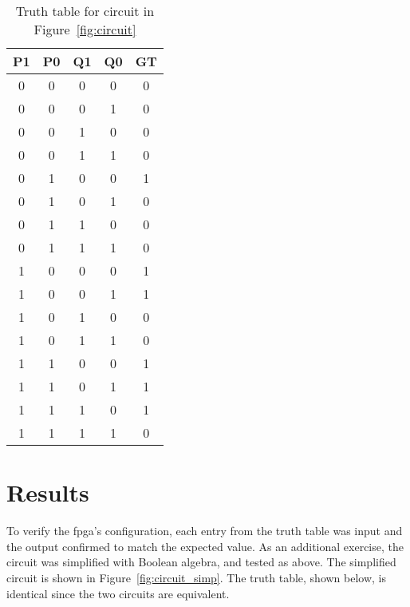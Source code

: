 \documentclass{article}
\begin{document}
\begin{table}[hbtp]
  \label{tab:truth}
  \centering
  \begin{tabular}{cccc|c}
    P1 & P0 & Q1 & Q0 & GT \\
    \hline
    0 & 0 & 0 & 0 & 0 \\
    0 & 0 & 0 & 1 & 0 \\
    0 & 0 & 1 & 0 & 0 \\
    0 & 0 & 1 & 1 & 0 \\
    0 & 1 & 0 & 0 & 1 \\
    0 & 1 & 0 & 1 & 0 \\
    0 & 1 & 1 & 0 & 0 \\
    0 & 1 & 1 & 1 & 0 \\
    1 & 0 & 0 & 0 & 1 \\
    1 & 0 & 0 & 1 & 1 \\
    1 & 0 & 1 & 0 & 0 \\
    1 & 0 & 1 & 1 & 0 \\
    1 & 1 & 0 & 0 & 1 \\
    1 & 1 & 0 & 1 & 1 \\
    1 & 1 & 1 & 0 & 1 \\
    1 & 1 & 1 & 1 & 0 \\
  \end{tabular}
  \caption{Truth table for circuit in Figure~\ref{fig:circuit}}
\end{table}

\section{Results}
\label{sec:results}
To verify the \gls{fpga}'s configuration, each entry from the truth
table was input and the output confirmed to match the expected value.
As an additional exercise, the circuit was simplified with Boolean
algebra, and tested as above.  The simplified circuit is shown in
Figure~\ref{fig:circuit_simp}.  The truth table, shown below, is
identical since the two circuits are equivalent.

\end{document}
